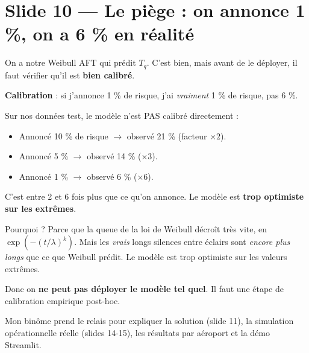 \documentclass[11pt,a4paper]{article}
\begin{document}
\section{Slide 10 — Le piège : on annonce 1 \%, on a 6 \% en réalité}

\begin{dire}
\og On a notre Weibull AFT qui prédit $T_q$. C'est bien, mais avant de le déployer, il
faut vérifier qu'il est \textbf{bien calibré}.

\textbf{Calibration} : si j'annonce 1 \% de risque, j'ai \emph{vraiment} 1 \% de risque,
pas 6 \%.

Sur nos données test, le modèle n'est PAS calibré directement :
\begin{itemize}[topsep=2pt]
    \item Annoncé 10 \% de risque $\to$ observé 21 \% (facteur $\times 2$).
    \item Annoncé 5 \% $\to$ observé 14 \% ($\times 3$).
    \item Annoncé 1 \% $\to$ observé 6 \% ($\times 6$).
\end{itemize}

C'est entre 2 et 6 fois plus que ce qu'on annonce. Le modèle est \textbf{trop optimiste
sur les extrêmes}.

Pourquoi ? Parce que la queue de la loi de Weibull décroît très vite, en
$\exp(-(t/\lambda)^k)$. Mais les \emph{vrais} longs silences entre éclairs sont
\emph{encore plus longs} que ce que Weibull prédit. Le modèle est trop optimiste sur
les valeurs extrêmes.

Donc on \textbf{ne peut pas déployer le modèle tel quel}. Il faut une étape de
calibration empirique post-hoc.

Mon binôme prend le relais pour expliquer la solution (slide 11), la simulation
opérationnelle réelle (slides 14-15), les résultats par aéroport et la démo Streamlit. \fg{}
\end{dire}
\end{document}
